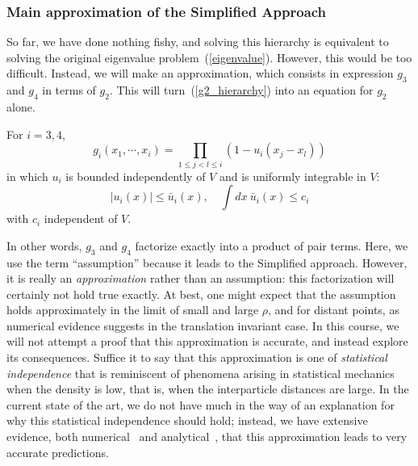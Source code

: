 \documentclass{ian}
\begin{document}
\subsubsection{Main approximation of the Simplified Approach}
\indent
So far, we have done nothing fishy, and solving this hierarchy is equivalent to solving the original eigenvalue problem\-~(\ref{eigenvalue}).
However, this would be too difficult.
Instead, we will make an approximation, which consists in expression $g_3$ and $g_4$ in terms of $g_2$.
This will turn\-~(\ref{g2_hierarchy}) into an equation for $g_2$ alone.
\bigskip

\label{assum:factorization}
  For $i=3,4$,
  \begin{equation}
    g_i(x_1,\cdots,x_i)
    =
    \prod_{1\leqslant j<l\leqslant i}
    (1-u_i(x_j-x_l))
    \label{g_factorized}
  \end{equation}
  in which $u_i$ is bounded independently of $V$ and is uniformly integrable in $V$:
  \begin{equation}
    |u_i(x)|\leqslant\bar u_i(x)
    ,\quad
    \int dx\ \bar u_i(x)\leqslant c_i
    \label{assum_bound}
  \end{equation}
  with $c_i$ independent of $V$.
\endtheo
\bigskip

In other words, $g_3$ and $g_4$ factorize exactly into a product of pair terms.
Here, we use the term ``assumption'' because it leads to the Simplified approach.
However, it is really an {\it approximation} rather than an assumption: this factorization will certainly not hold true exactly.
At best, one might expect that the assumption holds approximately in the limit of small and large $\rho$, and for distant points, as numerical evidence suggests in the translation invariant case.
In this course, we will not attempt a proof that this approximation is accurate, and instead explore its consequences.
Suffice it to say that this approximation is one of {\it statistical independence} that is reminiscent of phenomena arising in statistical mechanics when the density is low, that is, when the interparticle distances are large.
In the current state of the art, we do not have much in the way of an explanation for why this statistical independence should hold; instead, we have extensive evidence, both numerical\-~\cite{CHe21} and analytical\-~\cite{CJL20,CJL21}, that this approximation leads to very accurate predictions.
\bigskip
\end{document}
